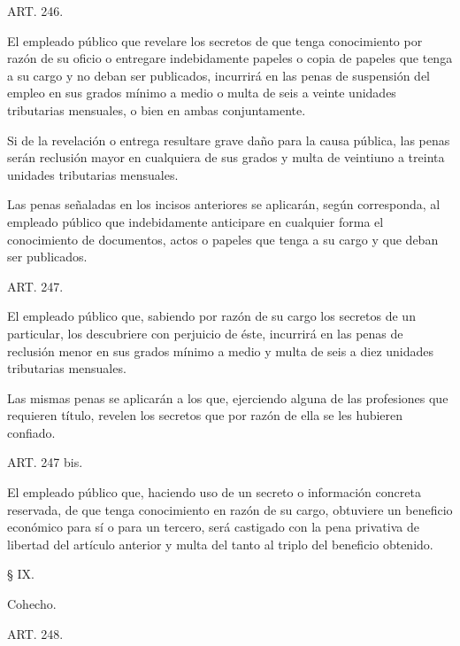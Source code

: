     ART. 246.

    El empleado público que revelare los secretos de que tenga conocimiento por razón de su oficio o entregare indebidamente papeles o copia de papeles que tenga a su cargo y no deban ser publicados, incurrirá en las penas de suspensión del empleo en sus grados mínimo a medio o multa de seis a veinte unidades tributarias mensuales, o bien en ambas conjuntamente.

    Si de la revelación o entrega resultare grave daño para la causa pública, las penas serán reclusión mayor en cualquiera de sus grados y multa de veintiuno a treinta unidades tributarias mensuales.

    Las penas señaladas en los incisos anteriores se aplicarán, según corresponda, al empleado público que indebidamente anticipare en cualquier forma el conocimiento de documentos, actos o papeles que tenga a su cargo y que deban ser publicados.


    ART. 247.

    El empleado público que, sabiendo por razón de su cargo los secretos de un particular, los descubriere con perjuicio de éste, incurrirá en las penas de reclusión menor en sus grados mínimo a medio y multa de seis a diez unidades tributarias mensuales.

    Las mismas penas se aplicarán a los que, ejerciendo alguna de las profesiones que requieren título, revelen los secretos que por razón de ella se les hubieren confiado.




    ART. 247 bis.

    El empleado público que, haciendo uso de un secreto o información concreta reservada, de que tenga conocimiento en razón de su cargo, obtuviere un beneficio económico para sí o para un tercero, será castigado con la pena privativa de libertad del artículo anterior y multa del tanto al triplo del beneficio obtenido.

    § IX.

    Cohecho.


    ART. 248.

